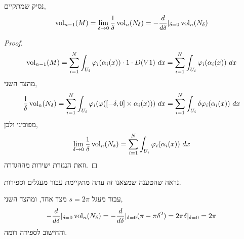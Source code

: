 \subquestion{}
נסיק שמתקיים,
\[
	\operatorname{vol}_{n - 1}(M)
	= \lim_{\delta \to 0} \frac{1}{\delta} \operatorname{vol}_n(N_{\delta})
	= - \frac{d}{d \delta} |_{\delta = 0} \operatorname{vol}_n(N_{\delta})
\]
\begin{proof}
	
	\[
		\operatorname{vol}_{n - 1}(M)
		= \sum_{i = 1}^N \int_{U_i} \varphi_i(\alpha_i(x)) \cdot 1 \cdot D(V 1)\ dx
		= \sum_{i = 1}^N \int_{U_i} \varphi_i(\alpha_i(x))\ dx
	\]
	מהצד השני,
	\[
		\frac{1}{\delta} \vol_n(N_{\delta})
		= \sum_{i = 1}^N \int_{U_i} \varphi_i(\varphi([-\delta, 0] \times \alpha_i(x)))\ dx 
		= \sum_{i = 1}^N \int_{U_i} \delta \varphi_i(\alpha_i(x))\ dx 
	\]
	מפוביני ולכן,
	\[
		\lim_{\delta \to 0} \frac{1}{\delta} \operatorname{vol}_n(N_{\delta})
		= \sum_{i = 1}^N \int_{U_i} \varphi_i(\alpha_i(x))\ dx
	\]
	וזאת הנגזרת ישירות מההגדרה.
\end{proof}

\subquestion{}
נראה שהטענה שמצאנו זה עתה מתקיימת עבור מעגלים וספירות.
\begin{solution}
	עבור מעגל $s = 2 \pi$ מצד אחד, ומהצד השני,
	\[
		- \frac{d}{d \delta} |_{\delta = 0} \operatorname{vol}_n(N_{\delta})
		= - \frac{d}{d \delta} |_{\delta = 0} (\pi - \pi \delta^2)
		= 2 \pi \delta |_{\delta = 0}
		= 2 \pi
	\]
	והחישוב לספירה דומה.
\end{solution}


